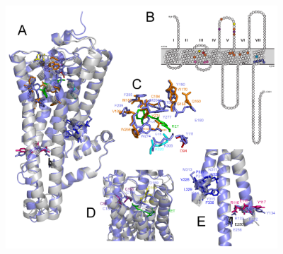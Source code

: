 \begin{figure}[hb]
  \includegraphics[width=4in]{./Chapter_RhodStruct/img/SpStructure.png}

\end{figure}
